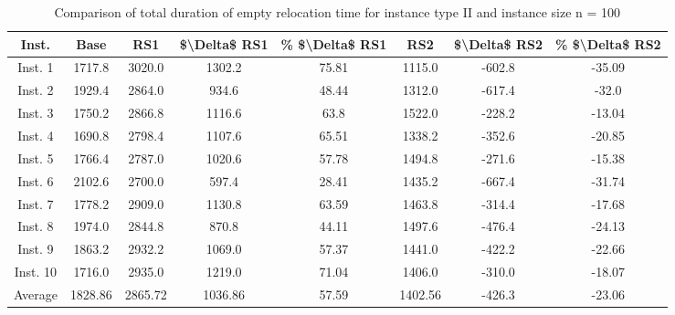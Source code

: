 \begin{table}[H]
\centering
\begin{tabular}{cccccccc}
  \hline
  \textbf{Inst.} & \textbf{Base} & \textbf{RS1} & \textbf{\$\textbackslash{}Delta\$  RS1} & \textbf{\% \$\textbackslash{}Delta\$  RS1} & \textbf{RS2} & \textbf{\$\textbackslash{}Delta\$  RS2} & \textbf{\% \$\textbackslash{}Delta\$  RS2} \\\hline
  Inst. 1 & 1717.8 & 3020.0 & 1302.2 & 75.81 & 1115.0 & -602.8 & -35.09 \\
  Inst. 2 & 1929.4 & 2864.0 & 934.6 & 48.44 & 1312.0 & -617.4 & -32.0 \\
  Inst. 3 & 1750.2 & 2866.8 & 1116.6 & 63.8 & 1522.0 & -228.2 & -13.04 \\
  Inst. 4 & 1690.8 & 2798.4 & 1107.6 & 65.51 & 1338.2 & -352.6 & -20.85 \\
  Inst. 5 & 1766.4 & 2787.0 & 1020.6 & 57.78 & 1494.8 & -271.6 & -15.38 \\
  Inst. 6 & 2102.6 & 2700.0 & 597.4 & 28.41 & 1435.2 & -667.4 & -31.74 \\
  Inst. 7 & 1778.2 & 2909.0 & 1130.8 & 63.59 & 1463.8 & -314.4 & -17.68 \\
  Inst. 8 & 1974.0 & 2844.8 & 870.8 & 44.11 & 1497.6 & -476.4 & -24.13 \\
  Inst. 9 & 1863.2 & 2932.2 & 1069.0 & 57.37 & 1441.0 & -422.2 & -22.66 \\
  Inst. 10 & 1716.0 & 2935.0 & 1219.0 & 71.04 & 1406.0 & -310.0 & -18.07 \\
  Average & 1828.86 & 2865.72 & 1036.86 & 57.59 & 1402.56 & -426.3 & -23.06 \\\hline
\end{tabular}
\caption{Comparison of total duration of empty relocation time for instance type II and instance size n = 100}
\label{tab:wait:resrelocation-empty-relocation-comparison_II_100}
\end{table}
